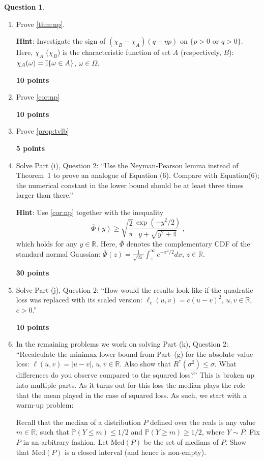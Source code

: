 \documentclass{article}
\newcommand{\R}{\mathbb{R}}
\DeclareMathOperator*{\1}{\mathbbm{1}}
\newcommand{\Prob}[1]{\mathbb{P}( #1 )}
\newcounter{DocPoints}
\newcounter{QuestionPoints}
\newcommand{\points}[1]{	\par\mbox{}\par\noindent\hfill {\bf #1 points}	\addtocounter{DocPoints}{#1}
	\addtocounter{QuestionPoints}{#1}
}
\theoremstyle{definition}
\newtheorem{question}{Question}
\theoremstyle{remark}
\newcommand{\hint}{\noindent \textbf{Hint}:\xspace}
\begin{document}
\begin{question}
\mbox{}

\begin{enumerate}[(Q1)]

\item Prove \cref{thm:np}.

\hint 
Investigate the sign of $(\chi_B - \chi_A)(q-\eta p)$ on $\{p>0 \text{ or } q>0\}$. Here, 
$\chi_A$ ($\chi_B$) is the characteristic function of set $A$ (respectively, $B$): $\chi_A(\omega) = \mathbb{I}\{\omega\in A\}$, $\omega\in \Omega$.

\points{10}

\item Prove \cref{cor:np}
\points{10}

\item Prove \cref{prop:tvlb}

\points{5}

\item Solve Part (i), Question 2: 
``Use the Neyman-Pearson lemma instead of Theorem~1 
to prove an analogue of Equation (6).
Compare with Equation(6); the numerical constant in the lower bound should be at least three times larger than there.''

\hint
Use \cref{cor:np} together with the inequality
\[
\overline\Phi(y) \ge \sqrt{\frac{2}{\pi}} \frac{\exp(-y^2/2)}{y + \sqrt{y^2+4}}\,,
\]
which holds for any $y\in \R$. 
Here,  $\overline\Phi$ denotes the complementary CDF of the standard normal Gaussian:
$\overline\Phi(z) = \frac{1}{\sqrt{2\pi}} \int_z^\infty e^{-x^2/2} dx$, $z\in \R$.
\points{30}

\item  Solve Part (j), Question 2: 
``How would the results look like if the quadratic loss was replaced with its scaled version:
$\ell_c(u,v) = c (u-v)^2$, $u,v\in \R$, $c>0$.''

\points{10}

\item  In the remaining problems we work on solving Part (k), Question 2:  ``Recalculate the minimax lower bound 
from Part~(g) for the
absolute value loss: $\ell(u,v) = |u-v|$, $u,v\in \R$.
Also show that $R^*(\sigma^2) \le \sigma$.
What differences do you observe compared to the squared loss?''
This is broken up into multiple parts. As it turns out for this loss the median plays the role that the mean played in the case of squared loss. As such, we start with a warm-up problem:

Recall that the median of a distribution $P$ defined over the reals is any value $m\in \R$, such that $\Prob{Y\le m}\le 1/2$ and $\Prob{Y\ge m}\ge 1/2$, where $Y\sim P$.
Fix $P$ in an arbitrary fashion. Let $\text{Med}(P)$ be the set of medians of $P$. Show that $\text{Med}(P)$ is a closed interval (and hence is non-empty).


\end{enumerate}
\end{question}
\end{document}
